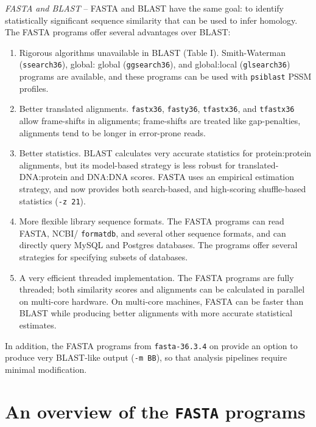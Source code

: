 \documentclass[11pt]{article}
\begin{document}
\emph{FASTA and BLAST} -- FASTA and BLAST have the same goal: to
identify statistically significant sequence similarity that can be
used to infer homology.  The FASTA programs offer several advantages
over BLAST:
\begin{enumerate}
\item
Rigorous algorithms unavailable in BLAST (Table I).  Smith-Waterman
(\texttt{ssearch36}), global: global (\texttt{ggsearch36}), and
global:local (\texttt{glsearch36}) programs are available, and these
programs can be used with \texttt{psiblast} PSSM profiles.
\item
Better translated alignments. \texttt{fastx36}, \texttt{fasty36},
\texttt{tfastx36}, and \texttt{tfastx36} allow frame-shifts in
alignments; frame-shifts are treated like gap-penalties, alignments
tend to be longer in error-prone reads.
\item
Better statistics. BLAST calculates very accurate statistics for
protein:protein alignments, but its model-based strategy is less
robust for translated-DNA:protein and DNA:DNA scores.  FASTA uses an
empirical estimation strategy, and now provides both search-based, and
high-scoring shuffle-based statistics (\texttt{-z 21}).
\item
More flexible library sequence formats.  The FASTA programs can read
FASTA, NCBI/ \texttt{formatdb}, and several other sequence formats, and can
directly query MySQL and Postgres databases. The programs offer
several strategies for specifying subsets of databases.
\item
A very efficient threaded implementation.  The FASTA programs are
fully threaded; both similarity scores and alignments can be
calculated in parallel on multi-core hardware.  On multi-core
machines, FASTA can be faster than BLAST while producing better
alignments with more accurate statistical estimates.

\end{enumerate}

In addition, the FASTA programs from \texttt{fasta-36.3.4} on provide
an option to produce very BLAST-like output (\texttt{-m BB}), so that
analysis pipelines require minimal modification.

\section{An overview of the \texttt{FASTA} programs}
\end{document}
